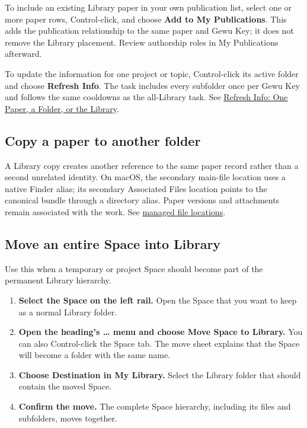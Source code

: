\documentclass[10pt,letterpaper,oneside]{scrreprt}
\providecommand{\tightlist}{\setlength{\itemsep}{1pt}\setlength{\parskip}{0pt}}
\begin{document}
To include an existing Library paper in your own publication list, select one or more paper rows, Control-click, and choose \textbf{Add to My Publications}. This adds the publication relationship to the same paper and Gewu Key; it does not remove the Library placement. Review authorship roles in My Publications afterward.

To update the information for one project or topic, Control-click its active folder and choose \textbf{Refresh Info}. The task includes every subfolder once per Gewu Key and follows the same cooldowns as the all-Library task. See \hyperref[loader-maintenance]{Refresh Info: One Paper, a Folder, or the Library}.

\subsection{Copy a paper to another folder}\label{copy-a-paper-to-another-folder}

A Library copy creates another reference to the same paper record rather than a second unrelated identity. On macOS, the secondary main-file location uses a native Finder alias; its secondary Associated Files location points to the canonical bundle through a directory alias. Paper versions and attachments remain associated with the work. See \hyperref[storage-model]{managed file locations}.

\subsection{Move an entire Space into Library}\label{move-an-entire-space-into-library}

Use this when a temporary or project Space should become part of the permanent Library hierarchy.

\begin{enumerate}
\tightlist
\item
  \textbf{Select the Space on the left rail.} Open the Space that you want to keep as a normal Library folder.
\item
  \textbf{Open the heading's \textbf{\ldots{}} menu and choose \textbf{Move Space to Library}.} You can also Control-click the Space tab. The move sheet explains that the Space will become a folder with the same name.
\item
  \textbf{Choose \textbf{Destination in My Library}.} Select the Library folder that should contain the moved Space.
\item
  \textbf{Confirm the move.} The complete Space hierarchy, including its files and subfolders, moves together.
\end{enumerate}
\end{document}
